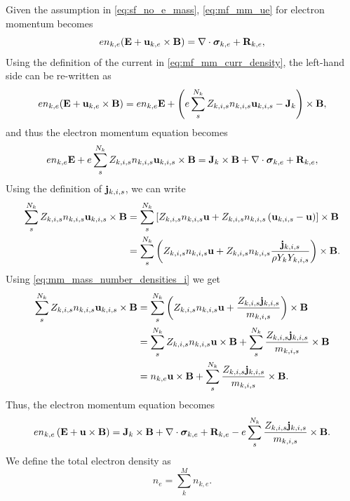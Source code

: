\documentclass[a4paper,11pt]{report}
\begin{document}
Given the assumption in \cref{eq:sf_no_e_mass}, \cref{eq:mf_mm_ue} for electron momentum becomes
\begin{equation*}
    e n_{k,e} ( \mathbf{E} + \mathbf{u}_{k,e} \times \mathbf{B} ) = \nabla \cdot \bm \sigma_{k,e} + \mathbf{R}_{k,e},
\end{equation*}
Using the definition of the current in \cref{eq:mf_mm_curr_density}, the left-hand side can be re-written as
\begin{equation*}
    e n_{k,e} ( \mathbf{E} + \mathbf{u}_{k,e} \times \mathbf{B} ) = e n_{k,e} \mathbf{E} + \left( e \sum_s^{N_k} Z_{k,i,s} n_{k,i,s} \mathbf{u}_{k,i,s} - \mathbf{J}_k \right) \times \mathbf{B},
\end{equation*}
and thus the electron momentum equation becomes
\begin{equation*}
    e n_{k,e} \mathbf{E} + e \sum_s^{N_k} Z_{k,i,s} n_{k,i,s} \mathbf{u}_{k,i,s} \times \mathbf{B} = \mathbf{J}_k \times \mathbf{B} + \nabla \cdot \bm \sigma_{k,e} + \mathbf{R}_{k,e},
\end{equation*}
Using the definition of $\mathbf{j}_{k,i,s}$, we can write
\begin{align*}
    \sum_s^{N_k} Z_{k,i,s} n_{k,i,s} \mathbf{u}_{k,i,s} \times \mathbf{B} &= \sum_s^{N_k} \left[ Z_{k,i,s} n_{k,i,s} \mathbf{u} + Z_{k,i,s} n_{k,i,s} \left( \mathbf{u}_{k,i,s} - \mathbf{u} \right) \right] \times \mathbf{B} \\
    &= \sum_s^{N_k} \left( Z_{k,i,s} n_{k,i,s} \mathbf{u} + Z_{k,i,s} n_{k,i,s} \frac{\mathbf{j}_{k,i,s}}{\rho Y_k Y_{k,i,s}} \right) \times \mathbf{B}.
\end{align*}
Using \cref{eq:mm_mass_number_densities_i} we get
\begin{align*}
    \sum_s^{N_k} Z_{k,i,s} n_{k,i,s} \mathbf{u}_{k,i,s} \times \mathbf{B} &= \sum_s^{N_k} \left( Z_{k,i,s} n_{k,i,s} \mathbf{u} + \frac{Z_{k,i,s} \mathbf{j}_{k,i,s}}{m_{k,i,s}} \right) \times \mathbf{B} \\
    &= \sum_s^{N_k} Z_{k,i,s} n_{k,i,s} \mathbf{u} \times \mathbf{B} + \sum_s^{N_k} \frac{Z_{k,i,s} \mathbf{j}_{k,i,s}}{m_{k,i,s}} \times \mathbf{B} \\
    &= n_{k,e} \mathbf{u} \times \mathbf{B} + \sum_s^{N_k} \frac{Z_{k,i,s} \mathbf{j}_{k,i,s}}{m_{k,i,s}} \times \mathbf{B}.
\end{align*}
Thus, the electron momentum equation becomes
\begin{equation*}
    e n_{k,e} \left( \mathbf{E} + \mathbf{u} \times \mathbf{B} \right) = \mathbf{J}_k \times \mathbf{B} + \nabla \cdot \bm \sigma_{k,e} + \mathbf{R}_{k,e} - e \sum_s^{N_k} \frac{Z_{k,i,s} \mathbf{j}_{k,i,s}}{m_{k,i,s}} \times \mathbf{B}.
\end{equation*}
We define the total electron density as 
\begin{equation*}
    n_e = \sum_k^M n_{k,e}.
\end{equation*}
\end{document}
